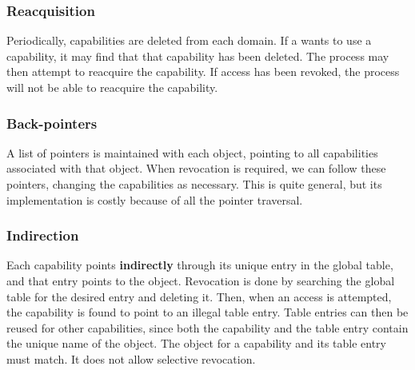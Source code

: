 \subsubsection{Reacquisition}\label{subsubsec:Capability_Revokation_Reacquisition}
Periodically, capabilities are deleted from each domain.
If a  wants to use a capability, it may find that that capability has been deleted.
The process may then attempt to reacquire the capability.
If access has been revoked, the process will not be able to reacquire the capability.

\subsubsection{Back-pointers}\label{subsubsec:Capability_Revokation_Back_Pointers}
A list of pointers is maintained with each object, pointing to all capabilities associated with that object.
When revocation is required, we can follow these pointers, changing the capabilities as necessary.
This is quite general, but its implementation is costly because of all the pointer traversal.

\subsubsection{Indirection}\label{subsubsec:Capability_Revokation_Indirection}
Each capability points \textbf{indirectly} through its unique entry in the global table, and that entry points to the object.
Revocation is done by searching the global table for the desired entry and deleting it.
Then, when an access is attempted, the capability is found to point to an illegal table entry.
Table entries can then be reused for other capabilities, since both the capability and the table entry contain the unique name of the object.
The object for a capability and its table entry must match.
It does not allow selective revocation.


